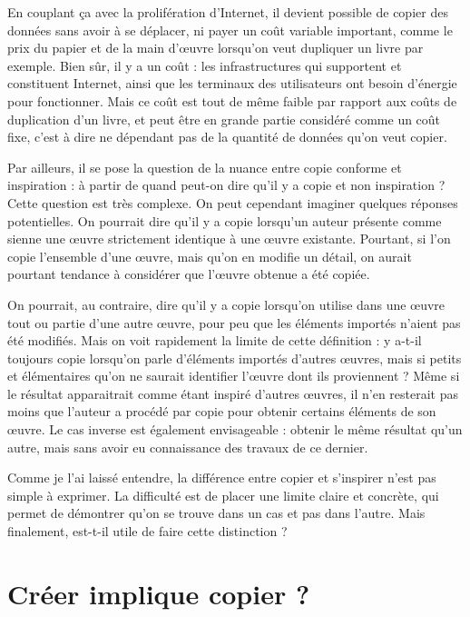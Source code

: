 En couplant ça avec la prolifération d'Internet, il devient possible de copier des données sans avoir à se déplacer, ni payer un coût variable important, comme le prix du papier et de la main d'œuvre lorsqu'on veut dupliquer un livre par exemple.
Bien sûr, il y a un coût : les infrastructures qui supportent et constituent Internet, ainsi que les terminaux des utilisateurs ont besoin d'énergie pour fonctionner.
Mais ce coût est tout de même faible par rapport aux coûts de duplication d'un livre, et peut être en grande partie considéré comme un coût fixe, c'est à dire ne dépendant pas de la quantité de données qu'on veut copier.

Par ailleurs, il se pose la question de la nuance entre copie conforme et inspiration : à partir de quand peut-on dire qu'il y a copie et non inspiration ?
Cette question est très complexe.
On peut cependant imaginer quelques réponses potentielles.
On pourrait dire qu'il y a copie lorsqu'un auteur présente comme sienne une œuvre strictement identique à une œuvre existante.
Pourtant, si l'on copie l'ensemble d'une œuvre, mais qu'on en modifie un détail, on aurait pourtant tendance à considérer que l'œuvre obtenue a été copiée.

On pourrait, au contraire, dire qu'il y a copie lorsqu'on utilise dans une œuvre tout ou partie d'une autre œuvre, pour peu que les éléments importés n'aient pas été modifiés.
Mais on voit rapidement la limite de cette définition : y a-t-il toujours copie lorsqu'on parle d'éléments importés d'autres œuvres, mais si petits et élémentaires qu'on ne saurait identifier l'œuvre dont ils proviennent ?
Même si le résultat apparaitrait comme étant inspiré d'autres œuvres, il n'en resterait pas moins que l'auteur a procédé par copie pour obtenir certains éléments de son œuvre.
Le cas inverse est également envisageable : obtenir le même résultat qu'un autre, mais sans avoir eu connaissance des travaux de ce dernier.

Comme je l'ai laissé entendre, la différence entre copier et s'inspirer n'est pas simple à exprimer.
La difficulté est de placer une limite claire et concrète, qui permet de démontrer qu'on se trouve dans un cas et pas dans l'autre.
Mais finalement, est-t-il utile de faire cette distinction ?

\section{Créer implique copier ?}

